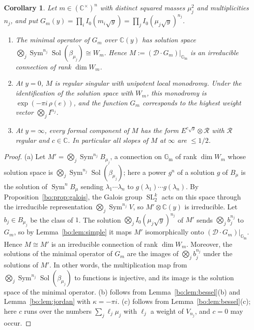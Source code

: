 \documentclass[11pt,a4paper]{article}
\newtheorem{corollary}[theorem]{Corollary}
\theoremstyle{definition}
\theoremstyle{remark}
\numberwithin{equation}{section}
\newcommand{\C}{\mathbb{C}}
\DeclareMathOperator{\Sol}{Sol}
\DeclareMathOperator{\SL}{SL}
\newcommand{\Gm}{\mathbb{G}_{\mathrm{m}}}
\newcommand{\cD}{\mathcal{D}}
\DeclareMathOperator{\Sym}{Sym}
\begin{document}
\begin{corollary}\label{bo:cor:M}
Let $m\in(\C^\times)^n$ with distinct squared masses $\mu_j^2$ and multiplicities $n_j$, and put $G_m(y)=\prod_iI_0(m_i\sqrt y)=\prod_jI_0(\mu_j\sqrt y)^{n_j}$.
\begin{enumerate}
\item[(a)] The minimal operator of $G_m$ over $\C(y)$ has solution space $\bigotimes_j\Sym^{n_j}\Sol(\beta_{\mu_j})\cong W_m$. Hence $M:=(\cD\cdot G_m)|_{\Gm}$ is an irreducible connection of rank $\dim W_m$.
\item[(b)] At $y=0$, $M$ is regular singular with unipotent local monodromy. Under the identification of the solution space with $W_m$, this monodromy is $\exp(-\pi i\,\rho(e))$, and the function $G_m$ corresponds to the highest weight vector $\bigotimes_jI^{n_j}$.
\item[(c)] At $y=\infty$, every formal component of $M$ has the form $E^{c\sqrt y}\otimes\mathcal R$ with $\mathcal R$ regular and $c\in\C$. In particular all slopes of $M$ at $\infty$ are $\le1/2$.
\end{enumerate}
\end{corollary}

\begin{proof}
(a) Let $M'=\bigotimes_j\Sym^{n_j}B_{\mu_j}$, a connection on $\Gm$ of rank $\dim W_m$ whose solution space is $\bigotimes_j\Sym^{n_j}\Sol(\beta_{\mu_j})$; here a power $g^{n}$ of a solution $g$ of $B_\mu$ is the solution of $\Sym^{n}B_\mu$ sending $\lambda_1\cdots\lambda_n$ to $g(\lambda_1)\cdots g(\lambda_n)$. By Proposition~\ref{bo:prop:galois}, the Galois group $\SL_2^k$ acts on this space through the irreducible representation $\bigotimes_j\Sym^{n_j}V$, so $M'\otimes\C(y)$ is irreducible. Let $b_j\in B_{\mu_j}$ be the class of $1$. The solution $\bigotimes_jI_0(\mu_j\sqrt y)^{n_j}$ of $M'$ sends $\bigotimes_jb_j^{n_j}$ to $G_m$, so by Lemma~\ref{bo:lem:simple} it maps $M'$ isomorphically onto $(\cD\cdot G_m)|_{\Gm}$. Hence $M\cong M'$ is an irreducible connection of rank $\dim W_m$. Moreover, the solutions of the minimal operator of $G_m$ are the images of $\bigotimes_jb_j^{n_j}$ under the solutions of $M'$. In other words, the multiplication map from $\bigotimes_j\Sym^{n_j}\Sol(\beta_{\mu_j})$ to functions is injective, and its image is the solution space of the minimal operator. (b) follows from Lemma~\ref{bo:lem:bessel}(b) and Lemma~\ref{bo:lem:jordan} with $\kappa=-\pi i$. (c) follows from Lemma~\ref{bo:lem:bessel}(c); here $c$ runs over the numbers $\sum_j\ell_j\mu_j$ with $\ell_j$ a weight of $V_{n_j}$, and $c=0$ may occur.
\end{proof}
\end{document}
